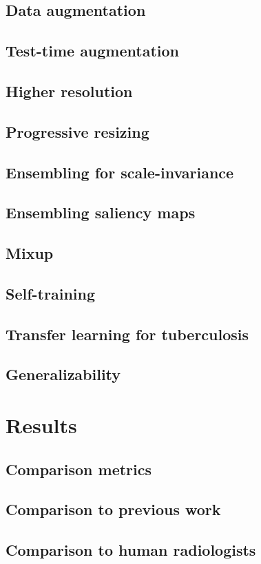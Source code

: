 \documentclass[11pt,twoside,a4paper]{report}
\begin{document}
    \section{Data augmentation}
    \section{Test-time augmentation}
    \section{Higher resolution}
    \section{Progressive resizing}
    \section{Ensembling for scale-invariance}
    \section{Ensembling saliency maps}
    \section{Mixup}
    \section{Self-training}
    \section{Transfer learning for tuberculosis}
    \section{Generalizability}
\chapter{Results\label{res}}
    \section{Comparison metrics}
    \section{Comparison to previous work}
    \section{Comparison to human radiologists}
\end{document}

